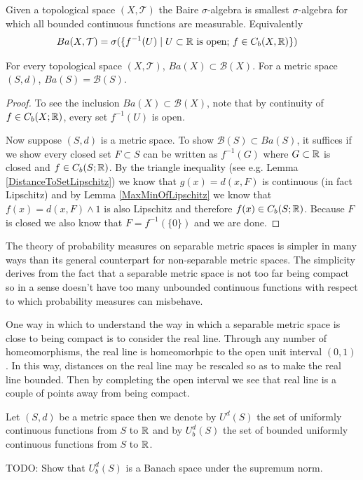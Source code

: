 \begin{defn}Given a topological space $(X, \mathcal{T})$ the Baire
  $\sigma$-algebra is smallest $\sigma$-algebra for which all bounded
  continuous functions are measurable.  Equivalently 
\begin{align*}
Ba(X,\mathcal{T}) &= \sigma(\lbrace f^{-1}(U) \mid U \subset \mathbb{R}
\text{ is open; } f \in C_b(X,\mathbb{R})\rbrace)
\end{align*}
\end{defn}
\begin{lem}For every topological space $(X, \mathcal{T})$, $Ba(X)
  \subset \mathcal{B}(X)$.  For a metric space $(S,d)$, $Ba(S) = \mathcal{B}(S)$.
\end{lem}
\begin{proof}
To see the inclusion $Ba(X)
  \subset \mathcal{B}(X)$, note that by continuity of $f \in
  C_b(X;\mathbb{R})$, every set $f^{-1}(U)$ is open.

Now suppose $(S,d)$ is a metric space.  To show $\mathcal{B}(S)
\subset Ba(S)$, it suffices if we show every closed set $F \subset S$
can be written as $f^{-1}(G)$ where $G \subset \mathbb{R}$ is closed and
$f \in C_b(S; \mathbb{R})$.  By the triangle inequality (see e.g. Lemma
\ref{DistanceToSetLipschitz}) we know
that $g(x) = d(x, F)$ is continuous (in fact Lipschitz) and by Lemma
\ref{MaxMinOfLipschitz} we know that $f(x) = d(x, F) \wedge 1$ is also
Lipschitz and therefore $f(x) \in C_b(S; \mathbb{R})$.  Because $F$ is
closed we also know that $F = f^{-1}(\lbrace 0 \rbrace)$ and we are done.
\end{proof}

The theory of probability measures on separable metric spaces is simpler in many ways than its general counterpart 
for non-separable metric spaces. The simplicity derives from the fact that a separable metric space is not too far being compact
so in a sense doesn't have too many unbounded continuous functions with respect to which probability measures can misbehave.

One way in which to understand the way in which a separable metric space is close to being compact is to consider the real line.  Through any number of homeomorphisms, the real line is homeomorhpic to the open unit interval $(0,1)$.  In this way, distances on the real line may be rescaled so as to make the real line bounded.  Then by completing the open interval we see that real line is a couple of points away from being compact.

\begin{defn}Let $(S,d)$ be a metric space then we denote by $U^d(S)$ the set of uniformly continuous functions from $S$ to $\mathbb{R}$ and by $U_b^d(S)$ the set of bounded uniformly continuous functions from $S$ to $\mathbb{R}$.
\end{defn}
TODO: Show that $U^d_b(S)$ is a Banach space under the supremum norm.

